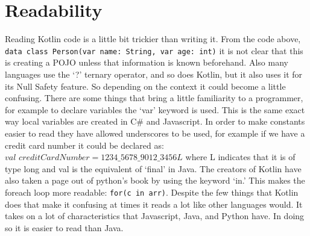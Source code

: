 \section*{Readability}
\hspace{1em}Reading Kotlin code is a little bit trickier than writing it. From the code above, \texttt{data class Person(var name: String, var age: int)} it is not clear that this is creating a POJO unless that information is known beforehand. Also many languages use the `?' ternary operator, and so does Kotlin, but it also uses it for its Null Safety feature. So depending on the context it could become a little confusing. There are some things that bring a little familiarity to a programmer, for example to declare variables the `var' keyword is used. This is the same exact way local variables are created in C\# and Javascript. In order to make constants easier to read they have allowed underscores to be used, for example if we have a credit card number it could be declared as: \\$val$ $creditCardNumber = 1234\_5678\_9012\_3456L$ where L indicates that it is of type long and val is the equivalent of `final' in Java. The creators of Kotlin have also taken a page out of python's book by using the keyword `in.' This makes the foreach loop more readable: \texttt{for(c in arr)}. Despite the few things that Kotlin does that make it confusing at times it reads a lot like other languages would. It takes on a lot of characteristics that Javascript, Java, and Python have. In doing so it is easier to read than Java.

